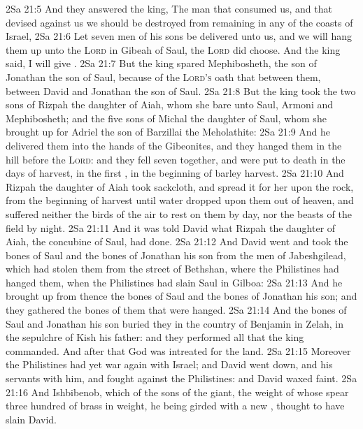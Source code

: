 \vs 2Sa 21:5 And they answered the king, The man that consumed us, and that devised against us  we should be destroyed from remaining in any of the coasts of Israel,
\vs 2Sa 21:6 Let seven men of his sons be delivered unto us, and we will hang them up unto the \textsc{Lord} in Gibeah of Saul,  the \textsc{Lord} did choose. And the king said, I will give .
\vs 2Sa 21:7 But the king spared Mephibosheth, the son of Jonathan the son of Saul, because of the \textsc{Lord's} oath that  between them, between David and Jonathan the son of Saul.
\vs 2Sa 21:8 But the king took the two sons of Rizpah the daughter of Aiah, whom she bare unto Saul, Armoni and Mephibosheth; and the five sons of Michal the daughter of Saul, whom she brought up for Adriel the son of Barzillai the Meholathite:
\vs 2Sa 21:9 And he delivered them into the hands of the Gibeonites, and they hanged them in the hill before the \textsc{Lord}: and they fell  seven together, and were put to death in the days of harvest, in the first , in the beginning of barley harvest.
\vs 2Sa 21:10 And Rizpah the daughter of Aiah took sackcloth, and spread it for her upon the rock, from the beginning of harvest until water dropped upon them out of heaven, and suffered neither the birds of the air to rest on them by day, nor the beasts of the field by night.
\vs 2Sa 21:11 And it was told David what Rizpah the daughter of Aiah, the concubine of Saul, had done.
\vs 2Sa 21:12 And David went and took the bones of Saul and the bones of Jonathan his son from the men of Jabeshgilead, which had stolen them from the street of Bethshan, where the Philistines had hanged them, when the Philistines had slain Saul in Gilboa:
\vs 2Sa 21:13 And he brought up from thence the bones of Saul and the bones of Jonathan his son; and they gathered the bones of them that were hanged.
\vs 2Sa 21:14 And the bones of Saul and Jonathan his son buried they in the country of Benjamin in Zelah, in the sepulchre of Kish his father: and they performed all that the king commanded. And after that God was intreated for the land.
\vs 2Sa 21:15 Moreover the Philistines had yet war again with Israel; and David went down, and his servants with him, and fought against the Philistines: and David waxed faint.
\vs 2Sa 21:16 And Ishbibenob, which  of the sons of the giant, the weight of whose spear  three hundred  of brass in weight, he being girded with a new , thought to have slain David.
